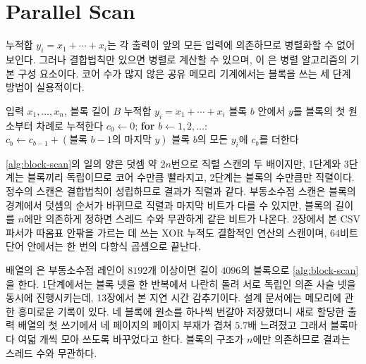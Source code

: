 \section{Parallel Scan}
\label{sec:parallel-scan}

누적합 $y_i=x_1+\cdots+x_i$는 각 출력이 앞의 모든 입력에 의존하므로 병렬화할 수 없어 보인다. 그러나 결합법칙만 있으면 병렬로 계산할 수 있으며, 이 은 병렬 알고리즘의 기본 구성 요소이다\cite{hillis1986,blelloch1990}. 코어 수가 많지 않은 공유 메모리 기계에서는 블록을 쓰는 세 단계 방법이 실용적이다.

\begin{algorithm}[t]
\begin{algorithmic}[1]
\Require 입력 $x_1,\dots,x_n$, 블록 길이 $B$
\Ensure 누적합 $y_i=x_1+\cdots+x_i$
 
  \State 블록 $b$ 안에서 $y$를 블록의 첫 원소부터 차례로 누적한다
\EndFor
\State $c_0\gets0$; \textbf{for} $b\gets1,2,\dots$: $c_b\gets c_{b-1}+(\text{블록 }b-1\text{의 마지막 }y)$ 
 
  \State 블록 $b$의 모든 $y_i$에 $c_b$를 더한다
\EndFor
\end{algorithmic}
\caption{블록을 쓰는 병렬 스캔}
\label{alg:block-scan}
\end{algorithm}

\cref{alg:block-scan}의 일의 양은 덧셈 약 $2n$번으로 직렬 스캔의 두 배이지만, 1단계와 3단계는 블록끼리 독립이므로 코어 수만큼 빨라지고, 2단계는 블록의 수만큼만 직렬이다. 정수의 스캔은 결합법칙이 성립하므로 결과가 직렬과 같다. 부동소수점 스캔은 블록의 경계에서 덧셈의 순서가 바뀌므로 직렬과 마지막 비트가 다를 수 있지만, 블록의 길이를 $n$에만 의존하게 정하면 스레드 수와 무관하게 같은 비트가 나온다. 2장에서 본 CSV 파서가 따옴표 안팎을 가르는 데 쓰는 XOR 누적도 결합적인 연산의 스캔이며, $64$비트 단어 안에서는 한 번의 다항식 곱셈으로 끝난다.

\begin{instardust}
배열의 은 부동소수점 레인이 $8192$개 이상이면 길이 $4096$의 블록으로 \cref{alg:block-scan}을 한다. 1단계에서는 블록 넷을 한 반복에서 나란히 돌려 서로 독립인 의존 사슬 넷을 동시에 진행시키는데, 13장에서 본 지연 시간 감추기이다. 설계 문서에는 메모리에 관한 흥미로운 기록이 있다. 네 블록에 원소를 하나씩 번갈아 저장했더니 새로 할당한 출력 배열의 첫 쓰기에서 네 페이지의 페이지 부재가 겹쳐 $5.7$배 느려졌고 그래서 블록마다 여덟 개씩 모아 쓰도록 바꾸었다고 한다. 블록의 구조가 $n$에만 의존하므로 결과는 스레드 수와 무관하다.
\end{instardust}

